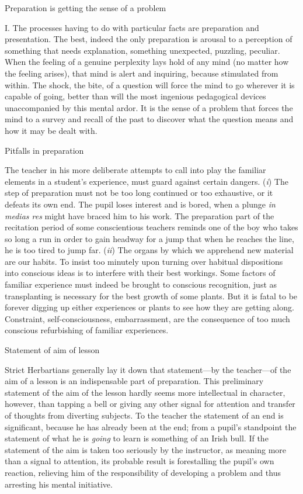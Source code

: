 \documentclass[letterpaper]{book}
\begin{document}
Preparation is getting the sense of a problem

I. The processes having to do with particular facts are preparation and
presentation. The best, indeed the only preparation is arousal to a
perception of something that needs explanation, something unexpected,
puzzling, peculiar. When the feeling of a genuine perplexity lays hold
of any mind (no matter how the feeling arises), that mind is alert and
inquiring, because stimulated from within. The shock, the bite, of a
question will force the mind to go wherever it is capable of going,
better than will the most ingenious pedagogical devices unaccompanied by
this mental ardor. It is the sense of a problem that forces the mind to
a survey and recall of the past to discover what the question means and
how it may be dealt with.

Pitfalls in preparation

The teacher in his more deliberate attempts to call into play the
familiar elements in a student's experience, must guard against certain
dangers. (\emph{i}) The step of preparation must not be too long
continued or too exhaustive, or it defeats its own end. The pupil loses
interest and is bored, when a plunge \emph{in medias res} might have
braced him to his work. The preparation part of the recitation period of
some conscientious teachers reminds one of the boy who takes so long a
run in order to gain headway for a jump that when he reaches the line,
he is too tired to jump far. (\emph{ii}) The organs by which we
apprehend new material are our habits. To insist too minutely upon
turning over habitual dispositions into conscious ideas is to interfere
with their best workings. Some factors of familiar experience must
indeed be brought to conscious recognition, just as
transplanting
is necessary for the best growth of some plants. But it is fatal to be
forever digging up either experiences or plants to see how they are
getting along. Constraint, self-consciousness, embarrassment, are the
consequence of too much conscious refurbishing of familiar experiences.

Statement of aim of lesson

Strict Herbartians generally lay it down that statement---by the
teacher---of the aim of a lesson is an indispensable part of
preparation. This preliminary statement of the aim of the lesson hardly
seems more intellectual in character, however, than tapping a bell or
giving any other signal for attention and transfer of thoughts from
diverting subjects. To the teacher the statement of an end is
significant, because he has already been at the end; from a pupil's
standpoint the statement of what he is \emph{going} to learn is
something of an Irish bull. If the statement of the aim is taken too
seriously by the instructor, as meaning more than a signal to attention,
its probable result is forestalling the pupil's own reaction, relieving
him of the responsibility of developing a problem and thus arresting his
mental initiative.
\end{document}
